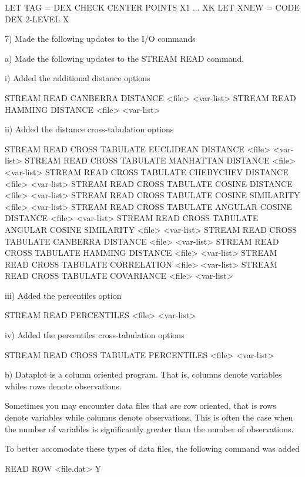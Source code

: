       LET TAG = DEX CHECK CENTER POINTS X1 ... XK
      LET XNEW = CODE DEX 2-LEVEL X

 7) Made the following updates to the I/O commands

    a) Made the following updates to the STREAM READ command.

         i) Added the additional distance options

               STREAM READ CANBERRA DISTANCE <file>  <var-list>
               STREAM READ HAMMING DISTANCE <file>  <var-list>

        ii) Added the distance cross-tabulation options

               STREAM READ CROSS TABULATE EUCLIDEAN DISTANCE <file>  <var-list>
               STREAM READ CROSS TABULATE MANHATTAN DISTANCE <file> <var-list>
               STREAM READ CROSS TABULATE CHEBYCHEV DISTANCE <file> <var-list>
               STREAM READ CROSS TABULATE COSINE DISTANCE <file> <var-list>
               STREAM READ CROSS TABULATE COSINE SIMILARITY <file> <var-list>
               STREAM READ CROSS TABULATE ANGULAR COSINE DISTANCE <file> <var-list>
               STREAM READ CROSS TABULATE ANGULAR COSINE SIMILARITY <file> <var-list>
               STREAM READ CROSS TABULATE CANBERRA DISTANCE <file> <var-list>
               STREAM READ CROSS TABULATE HAMMING DISTANCE <file> <var-list>
               STREAM READ CROSS TABULATE CORRELATION <file>  <var-list>
               STREAM READ CROSS TABULATE COVARIANCE <file>  <var-list>

       iii) Added the percentiles option

               STREAM READ PERCENTILES <file>  <var-list>

        iv) Added the percentiles cross-tabulation options

               STREAM READ CROSS TABULATE PERCENTILES <file>  <var-list>

    b) Dataplot is a column oriented program.  That is, columns
       denote variables whiles rows denote observations.

       Sometimes you may encounter data files that are row
       oriented, that is rows denote variables while columns
       denote observations.  This is often the case when the
       number of variables is significantly greater than the
       number of observations.

       To better accomodate these types of data files, the
       following command was added

           READ ROW <file.dat>  Y

